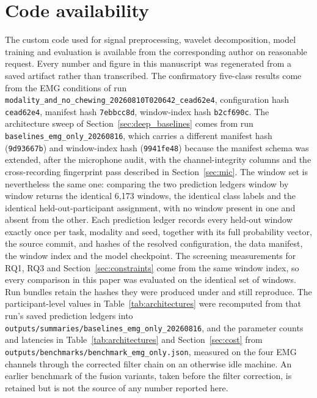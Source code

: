 \documentclass[pdflatex,sn-nature,iicol]{sn-jnl}
\begin{document}
\section*{Code availability}
The custom code used for signal preprocessing, wavelet decomposition, model training and evaluation is available from the corresponding author on reasonable request. Every number and figure in this manuscript was regenerated from a saved artifact rather than transcribed. The confirmatory five-class results come from the EMG conditions of run \texttt{modality\_and\_no\_chewing\_}\allowbreak\texttt{20260810T020642\_cead62e4}, configuration hash \texttt{cead62e4}, manifest hash \texttt{7ebbcc8d}, window-index hash \texttt{b2cf690c}. The architecture sweep of Section~\ref{sec:deep_baselines} comes from run \texttt{baselines\_emg\_only\_20260816}, which carries a different manifest hash (\texttt{9d93667b}) and window-index hash (\texttt{9941fe48}) because the manifest schema was extended, after the microphone audit, with the channel-integrity columns and the cross-recording fingerprint pass described in Section~\ref{sec:mic}. The window set is nevertheless the same one: comparing the two prediction ledgers window by window returns the identical 6,173 windows, the identical class labels and the identical held-out-participant assignment, with no window present in one and absent from the other. Each prediction ledger records every held-out window exactly once per task, modality and seed, together with its full probability vector, the source commit, and hashes of the resolved configuration, the data manifest, the window index and the model checkpoint. The screening measurements for RQ1, RQ3 and Section~\ref{sec:constraints} come from the same window index, so every comparison in this paper was evaluated on the identical set of windows. Run bundles retain the hashes they were produced under and still reproduce. The participant-level values in Table~\ref{tab:architectures} were recomputed from that run's saved prediction ledgers into \texttt{outputs/}\allowbreak\texttt{summaries/}\allowbreak\texttt{baselines\_emg\_only\_}\allowbreak\texttt{20260816}, and the parameter counts and latencies in Table~\ref{tab:architectures} and Section~\ref{sec:cost} from \texttt{outputs/benchmarks/}\allowbreak\texttt{benchmark\_emg\_only.json}, measured on the four EMG channels through the corrected filter chain on an otherwise idle machine. An earlier benchmark of the fusion variants, taken before the filter correction, is retained but is not the source of any number reported here.
\end{document}
